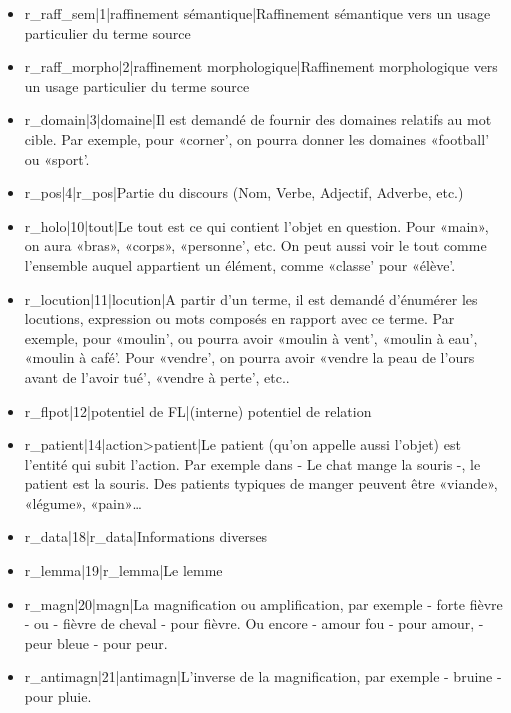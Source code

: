 \documentclass[a4paper,11pt,french]{article}
\begin{document}
\begin{itemize}
\item r\_raff\_sem|1|raffinement sémantique|Raffinement sémantique vers un usage particulier du terme source

\item r\_raff\_morpho|2|raffinement morphologique|Raffinement morphologique vers un usage particulier du terme source

\item r\_domain|3|domaine|Il est demandé de fournir des domaines relatifs au mot cible. Par exemple, pour «corner', on pourra donner les domaines «football' ou «sport'.

\item r\_pos|4|r\_pos|Partie du discours (Nom, Verbe, Adjectif, Adverbe, etc.)

\item r\_holo|10|tout|Le tout est ce qui contient l'objet en question. Pour «main», on aura «bras», «corps», «personne', etc. On peut aussi voir le tout comme l'ensemble auquel appartient un élément, comme «classe' pour «élève'.

\item r\_locution|11|locution|A partir d'un terme, il est demandé d'énumérer les locutions, expression ou mots composés en rapport avec ce terme. Par exemple, pour «moulin', ou pourra avoir «moulin à vent', «moulin à eau', «moulin à café'. Pour «vendre', on pourra avoir «vendre la peau de l'ours avant de l'avoir tué', «vendre à perte', etc..

\item r\_flpot|12|potentiel de FL|(interne) potentiel de relation

\item r\_patient|14|action>patient|Le patient (qu'on appelle aussi l'objet) est l'entité qui subit l'action. Par exemple dans - Le chat mange la souris -, le patient est la souris. Des patients typiques de manger peuvent être «viande», «légume», «pain»\dots{}

\item r\_data|18|r\_data|Informations diverses

\item r\_lemma|19|r\_lemma|Le lemme

\item r\_magn|20|magn|La magnification ou amplification, par exemple - forte fièvre - ou - fièvre de cheval - pour fièvre. Ou encore - amour fou - pour amour, - peur bleue - pour peur.

\item r\_antimagn|21|antimagn|L'inverse de la magnification, par exemple - bruine - pour pluie.


\end{itemize}
\end{document}
